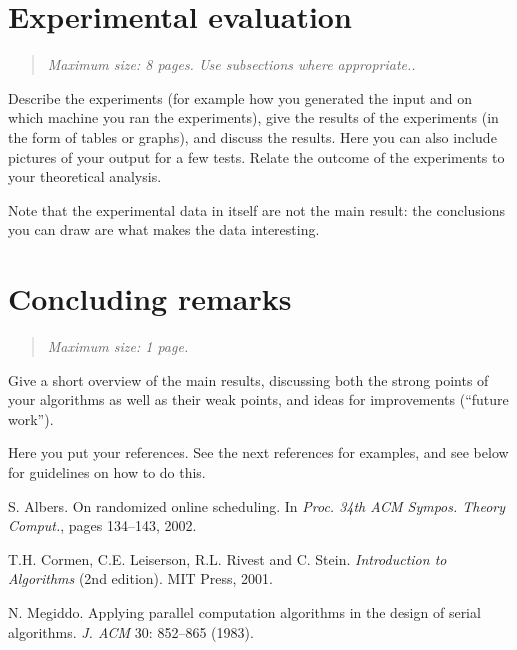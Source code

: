 \documentclass[11pt]{article}
\newcommand{\maxsize}[1]{\begin{quotation} {\sl \noindent Maximum size: #1.} \end{quotation}}
\begin{document}
\section{Experimental evaluation}
\label{se:evaluation}
\maxsize{8 pages. Use subsections where appropriate.}
Describe the experiments (for example how you generated the input and on which machine you
ran the experiments), give the results of the experiments (in the form of tables or graphs),
and discuss the results. Here you can also include pictures of your output for a few tests.
Relate the outcome of the experiments to your theoretical analysis.

Note that the experimental data in itself are not the main result: the conclusions
you can draw are what makes the data interesting.





\section{Concluding remarks}
\label{se:conclusions}
\maxsize{1 page}
Give a short overview of the main results, discussing both the strong
points of your algorithms as well as their weak points, and ideas for improvements
(``future work'').




\begin{thebibliography}{}

\bibitem{} Here you put your references. See the next references for examples, and see below
for guidelines on how to do this.

S. Albers.
On randomized online scheduling.
In \emph{Proc. 34th ACM Sympos. Theory Comput.}, pages 134--143, 2002.

T.H. Cormen, C.E. Leiserson, R.L. Rivest and C. Stein.
\emph{Introduction to Algorithms} (2nd edition).
MIT Press, 2001.

N. Megiddo.
Applying parallel computation algorithms in the design of serial algorithms.
\emph{J. ACM} 30: 852--865 (1983).

\end{thebibliography}
\end{document}
